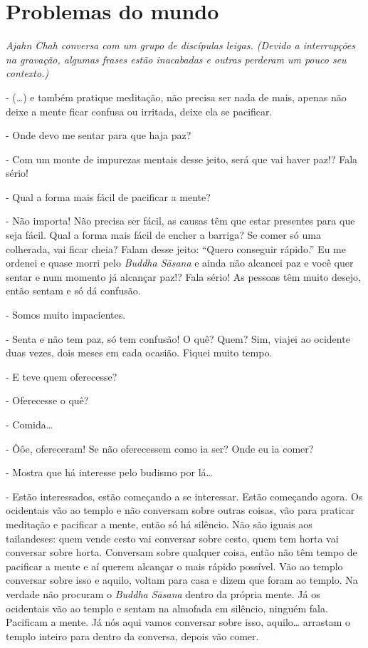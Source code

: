 
\chapter{Problemas do mundo}

{\itshape
Ajahn Chah conversa com um grupo de discípulas leigas. (Devido a
interrupções na gravação, algumas frases estão inacabadas e outras
perderam um pouco seu contexto.)}

{}- (…) e também pratique meditação, não precisa ser nada de mais,
apenas não deixe a mente ficar confusa ou irritada, deixe ela se
pacificar.

{}- Onde devo me sentar para que haja paz?

{}- Com um monte de impurezas mentais desse jeito, será que vai
haver paz!? Fala sério!

{}- Qual a forma mais fácil de pacificar a mente?

{}- Não importa! Não precisa ser fácil, as causas têm que estar
presentes para que seja fácil. Qual a forma mais fácil de encher a
barriga? Se comer só uma colherada, vai ficar cheia? Falam desse jeito:
“Quero conseguir rápido.” Eu me ordenei e quase morri pelo
\textit{Buddha S\=asana }e ainda não alcancei paz e você quer sentar e
num momento já alcançar paz!? Fala sério! As pessoas têm muito desejo,
então sentam e só dá confusão.

{}- Somos muito impacientes.

{}- Senta e não tem paz, só tem confusão! O quê? Quem? Sim, viajei
ao ocidente duas vezes, dois meses em cada ocasião. Fiquei muito tempo.

{}- E teve quem oferecesse?

{}- Oferecesse o quê?

{}- Comida…

{}- Ôôe, ofereceram! Se não oferecessem como ia ser? Onde eu ia
comer?

{}- Mostra que há interesse pelo budismo por lá…

{}- Estão interessados, estão começando a se interessar. Estão
começando agora. Os ocidentais vão ao templo e não conversam sobre
outras coisas, vão para praticar meditação e pacificar a mente, então
só há silêncio. Não são iguais aos tailandeses: quem vende cesto vai
conversar sobre cesto, quem tem horta vai conversar sobre horta.
Conversam sobre qualquer coisa, então não têm tempo de pacificar a
mente e aí querem alcançar o mais rápido possível. Vão ao templo
conversar sobre isso e aquilo, voltam para casa e dizem que foram ao
templo. Na verdade não procuram o \textit{Buddha S\=asana }dentro da
própria mente. Já os ocidentais vão ao templo e sentam na almofada em
silêncio, ninguém fala. Pacificam a mente. Já nós aqui vamos conversar
sobre isso, aquilo… arrastam o templo inteiro para dentro da conversa,
depois vão comer.

